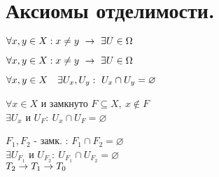 \documentclass[geometry.tex]{subfiles}
\begin{document}
  \section{Аксиомы отделимости.}

  \begin{theorem} [Колмогорова]
      $\forall x, y \in X: x \neq y \ \ra \ \exists U \in \Omega$
  \end{theorem}

  \begin{theorem} [Тихонова]
      $\forall x, y \in X: x \neq y \ \ra \ \exists U \in \Omega$
  \end{theorem}

  \begin{theorem} [Хаусдорфа]
      $\forall x, y \in X \q \exists U_x, U_y: \ U_x \cap U_y = \varnothing$
  \end{theorem}

  \begin{theorem} [3]
      $\forall x \in X$ и замкнуто $F \subseteq X, \  x \not \in F$\\
      $\exists U_x$ и $U_F : \ U_x \cap U_F = \varnothing$
  \end{theorem}

  \begin{theorem} [4]
      $F_1, F_2$ - замк. : $F_1 \cap F_2 = \varnothing$\\
      $\exists U_{F_1}$ и $U_{F_2}: \ U_{F_1} \cap U_{F_2} = \varnothing$\\
      $T_2 \rightarrow T_1 \rightarrow T_0$
  \end{theorem}
\end{document}
